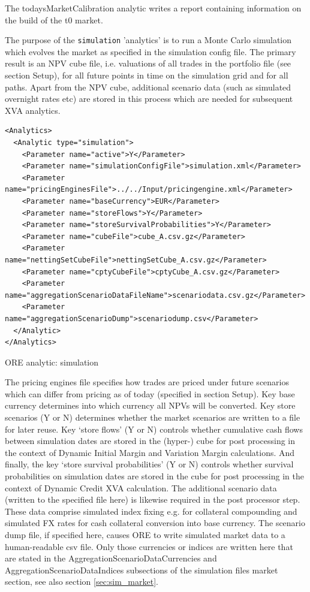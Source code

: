 \documentclass[12pt, a4paper]{article}
\begin{document}
The todaysMarketCalibration analytic writes a report containing information on the build of the t0 market.

\medskip The purpose of the {\tt simulation} 'analytics' is to run a Monte Carlo simulation which evolves the market as
specified in the simulation config file. The primary result is an NPV cube file, i.e. valuations of all trades in the
portfolio file (see section Setup), for all future points in time on the simulation grid and for all paths. Apart from
the NPV cube, additional scenario data (such as simulated overnight rates etc) are stored in this process which are
needed for subsequent XVA analytics.

\begin{listing}[H]
\begin{verbatim}
<Analytics>
  <Analytic type="simulation">
    <Parameter name="active">Y</Parameter>
    <Parameter name="simulationConfigFile">simulation.xml</Parameter>
    <Parameter name="pricingEnginesFile">../../Input/pricingengine.xml</Parameter>
    <Parameter name="baseCurrency">EUR</Parameter>
    <Parameter name="storeFlows">Y</Parameter>
    <Parameter name="storeSurvivalProbabilities">Y</Parameter>
    <Parameter name="cubeFile">cube_A.csv.gz</Parameter>
    <Parameter name="nettingSetCubeFile">nettingSetCube_A.csv.gz</Parameter>
    <Parameter name="cptyCubeFile">cptyCube_A.csv.gz</Parameter>
    <Parameter name="aggregationScenarioDataFileName">scenariodata.csv.gz</Parameter>
    <Parameter name="aggregationScenarioDump">scenariodump.csv</Parameter>
  </Analytic>
</Analytics>      
\end{verbatim}
\caption{ORE analytic: simulation}
\label{lst:ore_simulation}
\end{listing}

The pricing engines file specifies how trades are priced under future scenarios which can differ from pricing as of
today (specified in section Setup).  Key base currency determines into which currency all NPVs will be converted. Key
store scenarios (Y or N) determines whether the market scenarios are written to a file for later reuse. Key
`store flows' (Y or N) controls whether cumulative cash flows between simulation dates are stored in the (hyper-)
cube for post processing in the context of Dynamic Initial Margin and Variation Margin calculations. And finally, the
key `store survival probabilities' (Y or N) controls whether survival probabilities on simulation dates are stored in the
cube for post processing in the context of Dynamic Credit XVA calculation. The additional
scenario data (written to the specified file here) is likewise required in the post processor step. These data comprise
simulated index fixing e.g. for collateral compounding and simulated FX rates for cash collateral conversion into base
currency. The scenario dump file, if specified here, causes ORE to write simulated market data to a human-readable csv
file. Only those currencies or indices are written here that are stated in the AggregationScenarioDataCurrencies and 
AggregationScenarioDataIndices subsections of the simulation files market section, see also section
\ref{sec:sim_market}.
 
\end{document}
